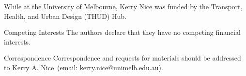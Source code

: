 \documentclass{nature}
\begin{document}






\begin{addendum}
 \item While at the University of Melbourne, Kerry Nice was funded by the Transport, Health, and Urban Design (THUD) Hub.
 \item[Competing Interests] The authors declare that they have no
competing financial interests.
 \item[Correspondence] Correspondence and requests for materials
should be addressed to Kerry A. Nice~(email: kerry.nice@unimelb.edu.au).
\end{addendum}


\end{document}
